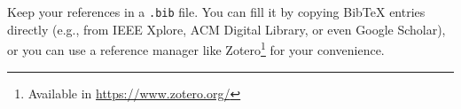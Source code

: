 \documentclass[conference, a4paper, 10pt]{IEEEtran}
\begin{document}
Keep your references in a \texttt{.bib} file. You can fill it by copying BibTeX entries directly (e.g., from IEEE Xplore, ACM Digital Library, or even Google Scholar), or you can use a reference manager like Zotero\footnote{Available in \url{https://www.zotero.org/}} for your convenience.







\end{document}
